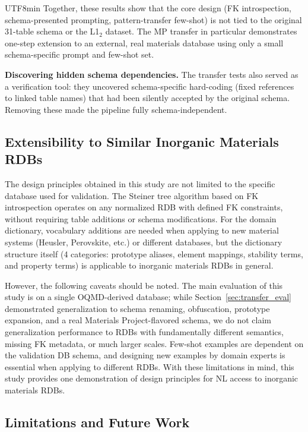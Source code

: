 \documentclass[sn-mathphys,Numbered]{sn-jnl}
\begin{document}
\begin{CJK}{UTF8}{min}
Together, these results show that the core design (FK
introspection, schema-presented prompting, pattern-transfer
few-shot) is not tied to the original 31-table schema or the L1$_2$
dataset. The MP transfer in particular demonstrates one-step
extension to an external, real materials database using only a
small schema-specific prompt and few-shot set.

\textbf{Discovering hidden schema dependencies.}
The transfer tests also served as a verification tool: they
uncovered schema-specific hard-coding (fixed references to linked
table names) that had been silently accepted by the original
schema. Removing these made the pipeline fully schema-independent.

\subsection{Extensibility to Similar Inorganic Materials RDBs}
\label{sec:extensibility}

The design principles obtained in this study are not limited to
the specific database used for validation.
The Steiner tree algorithm based on FK introspection operates on
any normalized RDB with defined FK constraints, without requiring
table additions or schema modifications.
For the domain dictionary, vocabulary additions are needed when
applying to new material systems (Heusler, Perovskite, etc.) or
different databases, but the dictionary structure itself
(4 categories: prototype aliases, element mappings, stability
terms, and property terms) is applicable to inorganic materials
RDBs in general.

However, the following caveats should be noted.
The main evaluation of this study is on a single OQMD-derived
database; while Section~\ref{sec:transfer_eval} demonstrated
generalization to schema renaming, obfuscation, prototype
expansion, and a real Materials Project-flavored schema, we do not
claim generalization performance to RDBs with fundamentally
different semantics, missing FK metadata, or much larger scales.
Few-shot examples are dependent on the validation DB schema, and
designing new examples by domain experts is essential when applying
to different RDBs.
With these limitations in mind, this study provides one
demonstration of design principles for NL access to inorganic
materials RDBs.

\subsection{Limitations and Future Work}


\end{CJK}
\end{document}
